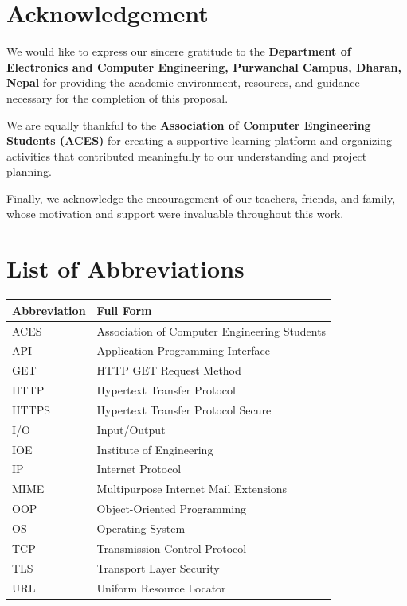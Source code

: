 \documentclass[11pt,a4paper]{article}
\begin{document}
\section*{Acknowledgement}
We would like to express our sincere gratitude to the \textbf{Department of Electronics and Computer Engineering, Purwanchal Campus, Dharan, Nepal} for providing the academic environment, resources, and guidance necessary for the completion of this proposal.

We are equally thankful to the \textbf{Association of Computer Engineering Students (ACES)} for creating a supportive learning platform and organizing activities that contributed meaningfully to our understanding and project planning.

Finally, we acknowledge the encouragement of our teachers, friends, and family, whose motivation and support were invaluable throughout this work.

\clearpage
{}
{}
\tableofcontents

\clearpage
{}
{}
\section*{List of Abbreviations}
\begin{table}[H]
\centering
\begin{tabular}{@{}ll@{}}
\toprule
\textbf{Abbreviation} & \textbf{Full Form} \\
\midrule
ACES  & Association of Computer Engineering Students \\
API   & Application Programming Interface \\
GET   & HTTP GET Request Method \\
HTTP  & Hypertext Transfer Protocol \\
HTTPS & Hypertext Transfer Protocol Secure \\
I/O   & Input/Output \\
IOE   & Institute of Engineering \\
IP    & Internet Protocol \\
MIME  & Multipurpose Internet Mail Extensions \\
OOP   & Object-Oriented Programming \\
OS    & Operating System \\
TCP   & Transmission Control Protocol \\
TLS   & Transport Layer Security \\
URL   & Uniform Resource Locator \\
\bottomrule
\end{tabular}
\end{table}
\end{document}
